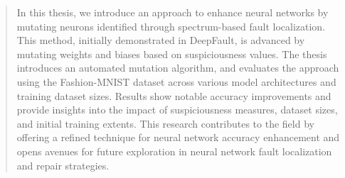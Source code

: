\begin{quotation}
    In this thesis, we introduce an approach to enhance neural networks by mutating neurons identified through spectrum-based fault localization.
    This method, initially demonstrated in DeepFault, is advanced by mutating weights and biases based on suspiciousness values.
    The thesis introduces an automated mutation algorithm, and evaluates the approach using the Fashion-MNIST dataset across various model architectures and training dataset sizes.
    Results show notable accuracy improvements and provide insights into the impact of suspiciousness measures, dataset sizes, and initial training extents.
    This research contributes to the field by offering a refined technique for neural network accuracy enhancement and opens avenues for future exploration in neural network fault localization and repair strategies.
\end{quotation}